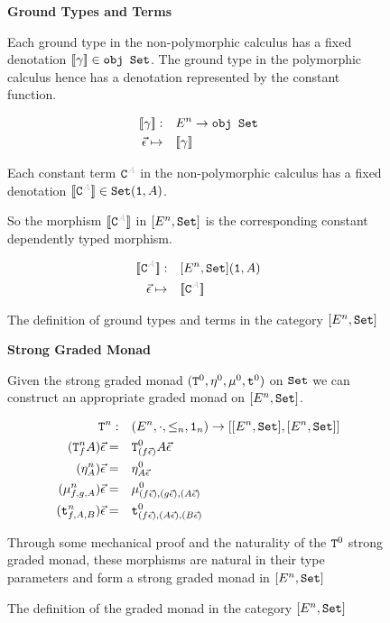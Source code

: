 \documentclass{Report}
\begin{document}
\begin{figure}
    \begin{framed}
        \centering\textbf{Ground Types and Terms}

        Each ground type in the non-polymorphic calculus has a fixed denotation ${\bf [\![}\gamma{\bf ]\!]}\in\texttt{obj }\texttt{Set}$. The ground type in the polymorphic calculus hence has a denotation represented by the constant function.
        
        \begin{align*}
            {\bf [\![}\gamma{\bf ]\!]}:&\quad E^n\rightarrow \texttt{obj }\texttt{Set}\\
            \vec{\epsilon} \mapsto&\quad  {\bf [\![}\gamma{\bf ]\!]}\\
        \end{align*}
        
        Each constant term $\const{A}$ in the non-polymorphic calculus has a fixed denotation $\deno{\const{A}}\in\set(\1, A)$.
        
        So the morphism $\deno{\const{A}}$ in $[E^n, \texttt{Set}]$ is the corresponding constant dependently typed morphism.
        
        \begin{align*}
            \deno{\const{A}}:&\quad[E^n, \set](\1, A)\\
            \ev\mapsto&\quad\deno{\const{A}}
        \end{align*}        
    \end{framed}
    \caption{The definition of ground types and terms in the category $[E^n, \texttt{Set}]$ }
    \label{HowToBuildGround}
\end{figure}


\begin{figure}
    \begin{framed}
        \centering\textbf{Strong Graded Monad}

Given the strong graded monad $(\texttt{T}^0_{}, \eta_{}^0, \mu^0, \texttt{t}^0)$ on $\texttt{Set}$ we can construct an appropriate graded monad on $[E^n, \texttt{Set}]$.

\begin{align*}
    \texttt{T}^n_{}:&\quad(E^n, \cdot, \leq_n, \texttt{1}_n) \rightarrow [[E^n, \texttt{Set}], [E^n, \texttt{Set}]]\\
    (\texttt{T}^n_{f}A)\vec{\epsilon}=&\quad \texttt{T}^0_{(f\vec{\epsilon})}A\vec{\epsilon}\\
    (\eta_{A}^n)\vec{\epsilon}=&\quad\eta_{A\vec{\epsilon}}^0\\
    (\mu_{f, g, A}^n)\vec{\epsilon}=&\quad\mu_{(f\vec{\epsilon}), (g\vec{\epsilon}), (A\vec{\epsilon})}^0\\
    (\texttt{t}_{f, A, B}^n)\vec{\epsilon}=&\quad\texttt{t}_{(f\vec{\epsilon}), (A\vec{\epsilon}), (B\vec{\epsilon})}^0
\end{align*}

Through some mechanical proof and the naturality of the $\texttt{T}^0_{}$ strong graded monad, these morphisms are natural in their type parameters and form a strong graded monad in $[E^n, \texttt{Set}]$

    \end{framed}
    \caption{The definition of the graded monad in the category $[E^n, \texttt{Set}]$}
    \label{HowToBuildMonad}
\end{figure}
\end{document}
